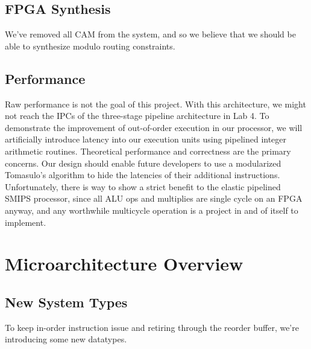 \documentclass[12pt]{article}
\begin{document}
\subsection{FPGA Synthesis}
We've removed all CAM from the system, and so we believe that we should be able to 
synthesize modulo routing constraints.

\subsection{Performance}
Raw performance is not the goal of this project. With this architecture, we might not 
reach the IPCs of the three-stage pipeline architecture in Lab 4. To demonstrate the 
improvement of out-of-order execution in our processor, we will artificially introduce 
latency into our execution units using pipelined integer arithmetic routines. Theoretical 
performance and correctness are the primary concerns. Our design 
should enable future developers to use  a modularized Tomasulo's algorithm to hide the 
latencies of their additional instructions.
Unfortunately, there is way to show a strict benefit to the elastic pipelined SMIPS 
processor, since all ALU ops and multiplies  are single cycle on an FPGA anyway, and any 
worthwhile multicycle operation is a project in and of itself to implement.


\section{Microarchitecture Overview}

\subsection{New System Types}

To keep in-order instruction issue and retiring through the reorder buffer, we're introducing some new datatypes. 
\end{document}
